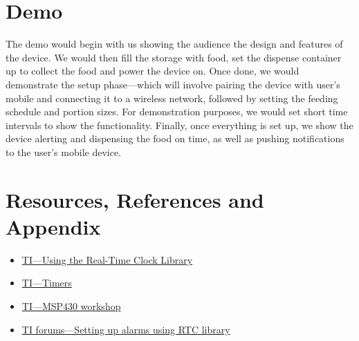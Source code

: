 \documentclass{article}
\begin{document}
\section{Demo}
The demo would begin with us showing the audience the design and features of the device. We would then fill the storage with food, set the dispense container up to collect the food and power the device on. Once done, we would demonstrate the setup phase---which will involve pairing the device with user's mobile and connecting it to a wireless network, followed by setting the feeding schedule and portion sizes. For demonstration purposes, we would set short time intervals to show the functionality. Finally, once everything is set up, we show the device alerting and dispensing the food on time, as well as pushing notifications to the user's mobile device.
\section{Resources, References and Appendix}
\begin{itemize}
    \item \href{https://www.ti.com/lit/an/slaa290a/slaa290a.pdf}{TI---Using the Real-Time Clock Library}
    \item \href{https://software-dl.ti.com/trainingTTO/trainingTTO_public_sw/MSP430_LaunchPad_Workshop/v4/Chapters/MSP430m06_TIMERS.pdf}{TI---Timers}
    \item \href{https://www.ti.com/video/series/msp430-workshop.html}{TI---MSP430 workshop}
    \item \href{https://e2e.ti.com/support/microcontrollers/msp-low-power-microcontrollers-group/msp430/f/msp-low-power-microcontroller-forum/670685/ccs-msp430fr5994-how-to-set-up-the-alarm-in-rtc-module}{TI forums---Setting up alarms using RTC library}
\end{itemize}
\end{document}
